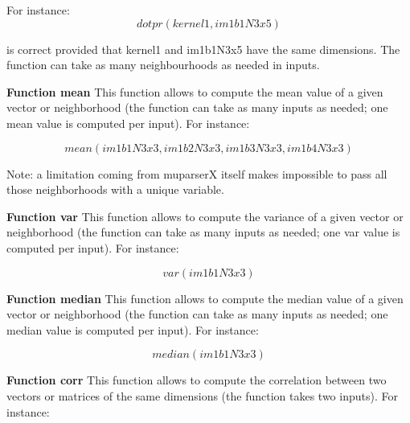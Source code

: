 For instance: 
\begin{equation}
  dotpr(kernel1,im1b1N3x5)
\end{equation}

is correct provided that kernel1 and im1b1N3x5 have the same dimensions. The function can take as many neighbourhoods as needed in inputs.


\begin{center}
\end{center}

\textbf{Function mean} \newline
This function allows to compute the mean value of a given vector or neighborhood (the function can take
as many inputs as needed; one mean value is computed per input). For instance:

\begin{equation}
	mean(im1b1N3x3,im1b2N3x3,im1b3N3x3,im1b4N3x3)
\end{equation}

Note: a limitation coming from muparserX itself makes impossible to pass all those neighborhoods with a unique variable.

\textbf{Function var} \newline
This function allows to compute the variance of a given vector or neighborhood (the function can take
as many inputs as needed; one var value is computed per input). For instance:

\begin{equation}
	var(im1b1N3x3)
\end{equation} 

\textbf{Function median} \newline
This function allows to compute the median value of a given vector or neighborhood (the function can take
as many inputs as needed; one median value is computed per input). For instance:

\begin{equation}
	median(im1b1N3x3)
\end{equation}

\textbf{Function corr} \newline
This function allows to compute the correlation between two vectors or matrices of the same dimensions (the function takes two inputs). For instance:

